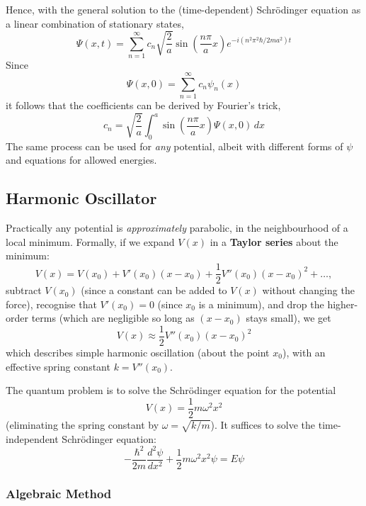 \documentclass{article}
\begin{document}
Hence, with the general solution to the (time-dependent) Schr\"{o}dinger
equation as a linear combination of stationary states,
\begin{equation} \label{eq:sch-eqn-psi}
  \Psi(x, t) = \sum_{n = 1}^{\infty}
    c_n\sqrt{\frac{2}{a}} \sin\left(\frac{n\pi}{a}x\right)
    e^{-i(n^2\pi^2\hbar/2ma^2)t}
\end{equation}
Since \[
  \Psi(x, 0) = \sum_{n = 1}^{\infty} c_n\psi_n(x)
\] it follows that the coefficients can be derived by Fourier's trick,
\begin{equation} \label{eq:sch-eqn-psi-coeff}
  c_n = \sqrt{\frac{2}{a}} \int_0^a
    \sin\left(\frac{n\pi}{a}x\right) \Psi(x, 0)
  \,dx
\end{equation}
The same process can be used for \emph{any} potential, albeit with different
forms of $\psi$ and equations for allowed energies.

\subsection{Harmonic Oscillator}

Practically any potential is \emph{approximately} parabolic, in the
neighbourhood of a local minimum. Formally, if we expand $V(x)$ in a
\textbf{Taylor series} about the minimum: \[
  V(x) = V(x_0) + V'(x_0)(x - x_0) + \frac{1}{2}V''(x_0)(x - x_0)^2 + \ldots,
\] subtract $V(x_0)$ (since a constant can be added to $V(x)$ without changing
the force), recognise that $V'(x_0) = 0$ (since $x_0$ is a minimum), and drop
the higher-order terms (which are negligible so long as $(x - x_0)$ stays
small), we get \[
  V(x) \approx \frac{1}{2}V''(x_0)(x - x_0)^2
\] which describes simple harmonic oscillation (about the point $x_0$), with an
effective spring constant $k = V''(x_0)$.

The quantum problem is to solve the Schr\"{o}dinger equation for the potential
\begin{equation} \label{eq:har-osc-1}
  V(x) = \frac{1}{2} m \omega^2 x^2
\end{equation}
(eliminating the spring constant by $\omega = \sqrt{k/m}$). It suffices to
solve the time-independent Schr\"{o}dinger equation:
\begin{equation} \label{eq:har-osc-2}
  -\frac{\hbar^2}{2m} \frac{d^2\psi}{dx^2} + \frac{1}{2}m\omega^2x^2\psi
  = E\psi
\end{equation}

\subsubsection{Algebraic Method}
\end{document}

